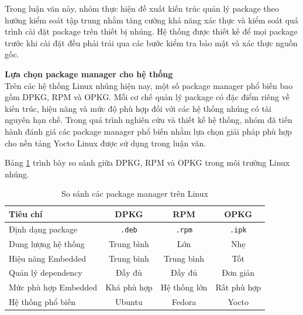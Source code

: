 Trong luận văn này, nhóm thực hiện đề xuất kiến trúc quản lý package theo hướng kiểm soát tập trung nhằm tăng cường khả năng xác thực và kiểm soát quá trình cài đặt package trên thiết bị nhúng. Hệ thống được thiết kế để mọi package trước khi cài đặt đều phải trải qua các bước kiểm tra bảo mật và xác thực nguồn gốc.

\vspace{0.5em}

\noindent\textbf{Lựa chọn package manager cho hệ thống} \\

Trên các hệ thống Linux nhúng hiện nay, một số package manager phổ biến bao gồm DPKG, RPM và OPKG. Mỗi cơ chế quản lý package có đặc điểm riêng về kiến trúc, hiệu năng và mức độ phù hợp đối với các hệ thống nhúng có tài nguyên hạn chế. Trong quá trình nghiên cứu và thiết kế hệ thống, nhóm đã tiến hành đánh giá các package manager phổ biến nhằm lựa chọn giải pháp phù hợp cho nền tảng Yocto Linux được sử dụng trong luận văn.

Bảng \ref{tab:package_manager_compare} trình bày so sánh giữa DPKG, RPM và OPKG trong môi trường Linux nhúng.
\begin{table}[H]
\centering
\caption{So sánh các package manager trên Linux}
\label{tab:package_manager_compare}

\begin{tabular}{|l|c|c|c|}
\hline
\textbf{Tiêu chí} & \textbf{DPKG} & \textbf{RPM} & \textbf{OPKG} \\ \hline

Định dạng package &
\texttt{.deb} &
\texttt{.rpm} &
\texttt{.ipk} \\ \hline

Dung lượng hệ thống &
Trung bình &
Lớn &
Nhẹ \\ \hline

Hiệu năng Embedded &
Trung bình &
Trung bình &
Tốt \\ \hline

Quản lý dependency &
Đầy đủ &
Đầy đủ &
Đơn giản \\ \hline

Mức phù hợp Embedded &
Khá phù hợp &
Hệ thống lớn &
Rất phù hợp \\ \hline

Hệ thống phổ biến &
Ubuntu &
Fedora &
Yocto \\ \hline

\end{tabular}
\end{table}

